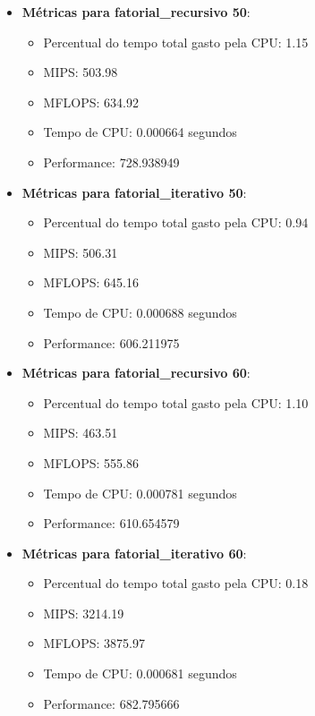 \documentclass[12pt]{article}
\begin{document}
\begin{itemize}
    \item \textbf{Métricas para fatorial\_recursivo 50}:
    \begin{itemize}
        \item Percentual do tempo total gasto pela CPU: 1.15
        \item MIPS: 503.98
        \item MFLOPS: 634.92
        \item Tempo de CPU: 0.000664 segundos
        \item Performance: 728.938949
    \end{itemize}

    \item \textbf{Métricas para fatorial\_iterativo 50}:
    \begin{itemize}
        \item Percentual do tempo total gasto pela CPU: 0.94
        \item MIPS: 506.31
        \item MFLOPS: 645.16
        \item Tempo de CPU: 0.000688 segundos
        \item Performance: 606.211975
    \end{itemize}

    \item \textbf{Métricas para fatorial\_recursivo 60}:
    \begin{itemize}
        \item Percentual do tempo total gasto pela CPU: 1.10
        \item MIPS: 463.51
        \item MFLOPS: 555.86
        \item Tempo de CPU: 0.000781 segundos
        \item Performance: 610.654579
    \end{itemize}

    \item \textbf{Métricas para fatorial\_iterativo 60}:
    \begin{itemize}
        \item Percentual do tempo total gasto pela CPU: 0.18
        \item MIPS: 3214.19
        \item MFLOPS: 3875.97
        \item Tempo de CPU: 0.000681 segundos
        \item Performance: 682.795666
    \end{itemize}


\end{itemize}
\end{document}
